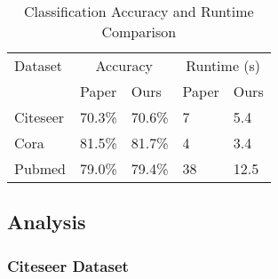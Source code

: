\documentclass[11pt,a4paper]{article}
\begin{document}

\begin{table}[ht]
  \centering
  \caption{Classification Accuracy and Runtime Comparison}
  \label{tab:accuracy_runtime_comparison}
  \begin{tabularx}{\columnwidth}{lXXXX}
  \hline
  Dataset & \multicolumn{2}{c}{Accuracy} & \multicolumn{2}{c}{Runtime (s)} \\ \cline{2-3} \cline{4-5}
          & Paper & Ours & Paper & Ours \\ \hline
  Citeseer & 70.3\% & 70.6\% & 7 & 5.4 \\
  Cora     & 81.5\% & 81.7\% & 4 & 3.4 \\
  Pubmed   & 79.0\% & 79.4\% & 38 & 12.5 \\ \hline
  \end{tabularx}
\end{table}





\subsection{Analysis}

\subsubsection{Citeseer Dataset}
\end{document}
